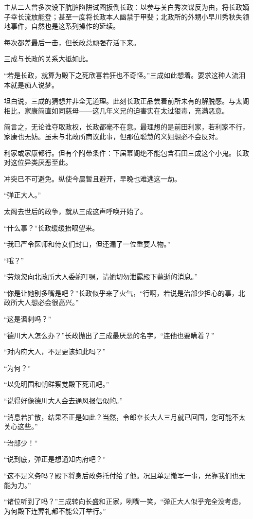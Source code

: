 \documentclass[
]{book}
\begin{document}
主从二人曾多次设下肮脏陷阱试图扳倒长政：以参与关白秀次谋反为由，将长政嫡子幸长流放能登；甚至一度将长政本人幽禁于甲斐；北政所的外甥小早川秀秋失领地事件，自然也是这系列操作的延续。

每次都差最后一击，但长政总顽强存活下来。

三成与长政的关系大抵如此。

``若是长政，就算为殿下之死欣喜若狂也不奇怪。''三成如此想着。要求这种人流泪本就是痴人说梦。

坦白说，三成的猜想并非全无道理。此刻长政正品尝着前所未有的解脱感。与太阁相比，家康简直如同慈母------这几年义兄的迫害实在太过狠毒，充满恶意。

简言之，无论谁夺取政权，长政都毫不在意。最理想的是前田利家，若利家不行，家康也无妨。虽未与北政所商议此事，但那位聪慧的义姐想必不会反对。

利家或家康都行。但有个附带条件：下届幕阁绝不能包含石田三成这个小鬼。长政对这位异类厌恶至此。

冲突已不可避免。纵使今晨暂且避开，早晚也难逃这一劫。

``弹正大人。''

太阁去世后的政争，就从三成这声呼唤开始了。

``什么事？''长政缓缓抬眼望来。

``我已严令医师和侍女们封口，但还漏了一位重要人物。''

``哦？''

``劳烦您向北政所大人委婉叮嘱，请她切勿泄露殿下薨逝的消息。''

``你是让她别多嘴是吧？''长政似乎来了火气，``行啊，若说是治部少担心的事，北政所大人想必会很高兴。''

``这是讽刺吗？''

``德川大人怎么办？''长政抛出了三成最厌恶的名字，``连他也要瞒着？''

``对内府大人，不是更该如此吗？''

``为何？''

``以免明国和朝鲜察觉殿下死讯吧。''

``说得好像德川大人会去通风报信似的。''

``消息若扩散，结果不正是如此？当然，令郎幸长大人三月就已回国，您可能不太关心这些。''

``治部少！''

``说到底，弹正是想通知内府吧？''

``这不是义务吗？殿下将身后政务托付给了他。况且单是撤军一事，光靠我们也无能为力。''

``诸位听到了吗？''三成转向长盛和正家，咧嘴一笑，``弹正大人似乎完全没考虑，为何殿下连葬礼都不能公开举行。''
\end{document}
